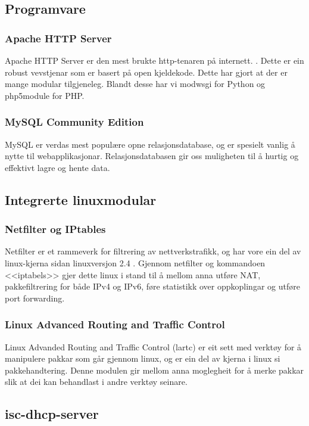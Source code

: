 \documentclass[nynorsk,12pt,a4paper,oneside]{book}
\begin{document}
\subsection{Programvare}
\subsubsection{Apache HTTP Server}
Apache HTTP Server er den mest brukte http-tenaren på internett. \cite{apahcetraf}. Dette er ein robust vevstjenar som er basert på open kjeldekode. Dette har gjort at der er mange modular tilgjeneleg. Blandt desse har vi mod\textunderscore wsgi for Python og php5\textunderscore module for PHP. \cite{modwsgi, phpmodule}

\subsubsection{MySQL Community Edition}
MySQL er verdas mest populære opne relasjonsdatabase, og er spesielt vanlig å nytte til webapplikasjonar. Relasjonsdatabasen gir oss muligheten til å hurtig og effektivt lagre og hente data. 

\subsection{Integrerte linuxmodular}
\subsubsection{Netfilter og IPtables}
Netfilter er et rammeverk for filtrering av nettverkstrafikk, og har vore ein del av linux-kjerna sidan linuxversjon 2.4 \cite{netfiltercore}. Gjennom netfilter og kommandoen <<iptabels>> gjer dette linux i stand til å mellom anna utføre NAT, pakkefiltrering for både IPv4 og IPv6, føre statistikk over oppkoplingar og utføre port forwarding. 

\subsubsection{Linux Advanced Routing and Traffic Control}
Linux Advanded Routing and Traffic Control (lartc) er eit sett med verktøy for å manipulere pakkar som går gjennom linux, og er ein del av kjerna i linux si pakkehandtering. \cite{lartcintro} Denne modulen gir mellom anna moglegheit for å merke pakkar slik at dei kan behandlast i andre verktøy seinare. 

\subsection{isc-dhcp-server}
\end{document}
